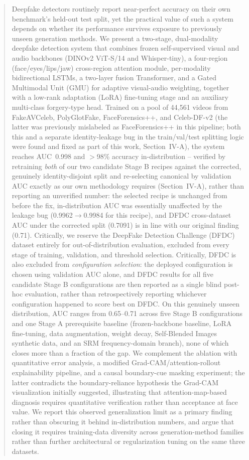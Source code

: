 \documentclass[conference]{IEEEtran}
\begin{document}
\begin{abstract}
Deepfake detectors routinely report near-perfect accuracy on their own
benchmark's held-out test split, yet the practical value of such a system
depends on whether its performance survives exposure to previously unseen
generation methods. We present a two-stage, dual-modality deepfake
detection system that combines frozen self-supervised visual and audio
backbones (DINOv2 ViT-S/14 and Whisper-tiny), a four-region
(face/eyes/lips/jaw) cross-region attention module, per-modality bidirectional
LSTMs, a two-layer fusion Transformer, and a Gated Multimodal Unit (GMU) for
adaptive visual-audio weighting, together with a low-rank adaptation (LoRA)
fine-tuning stage and an auxiliary multi-class forgery-type head. Trained on
a pool of 44{,}561 videos from FakeAVCeleb, PolyGlotFake, FaceForensics++,
and Celeb-DF-v2 (the latter was previously mislabeled as FaceForensics++ in
this pipeline; both this and a separate identity-leakage bug in the
train/val/test splitting logic were found and fixed as part of this work,
Section~IV-A), the system reaches AUC~0.998 and $>$98\% accuracy
in-distribution -- verified by retraining \emph{both} of our two candidate
Stage B recipes against the corrected, genuinely identity-disjoint split and
re-selecting canonical by validation AUC exactly as our own methodology
requires (Section~IV-A), rather than reporting an unverified number: the
selected recipe is unchanged from before the fix, in-distribution AUC was
essentially unaffected by the leakage bug (0.9962$\to$0.9984 for this
recipe), and DFDC cross-dataset AUC under the corrected split (0.7091) is
in line with our original finding (0.71). Critically, we reserve
the DeepFake Detection Challenge (DFDC) dataset entirely for
out-of-distribution evaluation, excluded from every stage of training,
validation, and threshold selection. Critically, DFDC is also excluded from
\emph{configuration selection}: the deployed configuration is chosen using
validation AUC alone, and DFDC results for all five candidate Stage B
configurations are then reported as a single blind post-hoc evaluation,
rather than retrospectively reporting whichever configuration happened to
score best on DFDC. On this genuinely unseen distribution, AUC ranges from
0.65--0.71 across five Stage B configurations and one Stage A prerequisite
baseline (frozen-backbone baseline, LoRA fine-tuning, data augmentation,
weight decay, Self-Blended Images synthetic data, and an SRM
frequency-domain branch), none of which closes more than a fraction of the
gap. We complement the ablation
with quantitative error analysis, a modified Grad-CAM/attention-rollout
explainability pipeline, and a causal boundary-cue masking experiment; the
latter contradicts the boundary-reliance hypothesis the Grad-CAM
visualization initially suggested, illustrating that attention-map-based
diagnosis requires quantitative verification rather than acceptance at face
value. We report this observed
generalization limit as a primary finding rather than obscuring it behind
in-distribution numbers, and argue that closing it requires training-data
diversity across
generation-method families rather than further architectural or
regularization tuning on the same three datasets.
\end{abstract}
\end{document}
